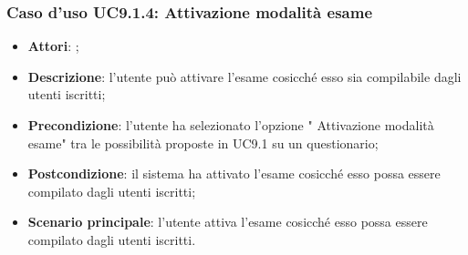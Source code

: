 		\subsubsection{Caso d'uso UC9.1.4: Attivazione modalità esame}
		\label{UC9.1.4}
		\begin{itemize}
			\item \textbf{Attori}: \uaupro;
			\item \textbf{Descrizione}: l'utente può attivare l'esame cosicché esso sia compilabile dagli utenti iscritti;
			\item \textbf{Precondizione}: l'utente ha selezionato l'opzione " Attivazione modalità esame" tra le possibilità proposte in UC9.1 su un questionario;
			\item \textbf{Postcondizione}: il sistema ha attivato l'esame cosicché esso possa essere compilato dagli utenti iscritti;
			\item \textbf{Scenario principale}: l'utente attiva l'esame cosicché esso possa essere compilato dagli utenti iscritti.
		\end{itemize}
										
